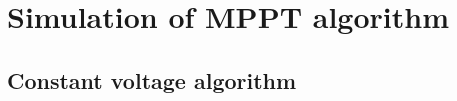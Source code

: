 \section{Simulation of MPPT algorithm}\label{MPPTSimulation}

\subsection{Constant voltage algorithm}